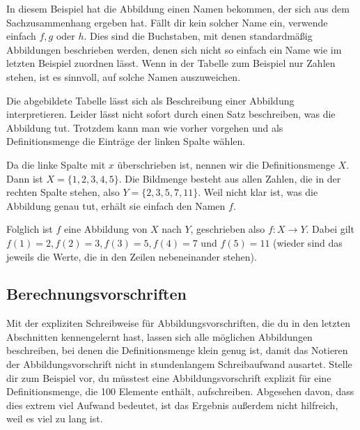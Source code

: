 \documentclass[../../main.tex]{subfiles}
\begin{document}
In diesem Beispiel hat die Abbildung einen Namen bekommen, der sich aus dem Sachzusammenhang ergeben hat. Fällt dir kein solcher Name ein, verwende einfach $f, g$ oder $h$. Dies sind die Buchstaben, mit denen standardmäßig Abbildungen beschrieben werden, denen sich nicht so einfach ein Name wie im letzten Beispiel zuordnen lässt. Wenn in der Tabelle zum Beispiel nur Zahlen stehen, ist es sinnvoll, auf solche Namen auszuweichen.

\begin{example}
    
    Die abgebildete Tabelle lässt sich als Beschreibung einer Abbildung interpretieren. Leider lässt nicht sofort durch einen Satz beschreiben, was die Abbildung tut. Trotzdem kann man wie vorher vorgehen und als Definitionsmenge die Einträge der linken Spalte wählen.
    
    Da die linke Spalte mit $x$ überschrieben ist, nennen wir die Definitionsmenge $X$. Dann ist $X=\{1,2,3,4,5\}$. Die Bildmenge besteht aus allen Zahlen, die in der rechten Spalte stehen, also $Y=\{2,3,5,7,11\}$. Weil nicht klar ist, was die Abbildung genau tut, erhält sie einfach den Namen $f$.
    
    Folglich ist $f$ eine Abbildung von $X$ nach $Y$, geschrieben also $f\colon X\rightarrow Y$. Dabei gilt $f(1)=2, f(2)=3, f(3)=5, f(4)=7$ und $f(5)=11$ (wieder sind das jeweils die Werte, die in den Zeilen nebeneinander stehen).
\end{example}

\subsection{Berechnungsvorschriften}
\label{sec:abbildungen_berechnungsvorschriften}

Mit der expliziten Schreibweise für Abbildungsvorschriften, die du in den letzten Abschnitten kennengelernt hast, lassen sich alle möglichen Abbildungen beschreiben, bei denen die Definitionsmenge klein genug ist, damit das Notieren der Abbildungsvorschrift nicht in stundenlangem Schreibaufwand ausartet. Stelle dir zum Beispiel vor, du müsstest eine Abbildungsvorschrift explizit für eine Definitionsmenge, die 100 Elemente enthält, aufschreiben. Abgesehen davon, dass dies extrem viel Aufwand bedeutet, ist das Ergebnis außerdem nicht hilfreich, weil es viel zu lang ist.
\end{document}
